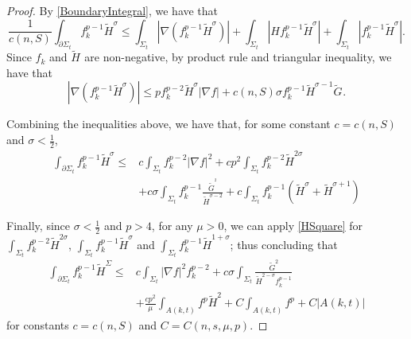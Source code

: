 \begin{proof}
    By \autoref{BoundaryIntegral}, we have that 
    \[
        \frac{1}{c(n,S)}\int_{\partial \Sigma_t} f_{k}^{p-1} \tilde{H}^{\sigma }  \leq \int_{\Sigma_t} \left| \nabla \left( f_{k}^{p-1} \tilde{H}^{\sigma }  \right)  \right| + \int_{\Sigma_t} \left| H f_{k}^{p-1} \tilde{H}^{\sigma } \right| + \int_{\Sigma_t} \left| f_{k}^{p-1} \tilde{H}^{\sigma } \right|.
    \]
    Since $f_{k}^{} $ and $\tilde{H}^{} $ are non-negative, by product rule and triangular inequality, we have that
    \[
        \left| \nabla \left( f_{k}^{p-1} \tilde{H}^{\sigma }  \right)  \right| \leq p f_{k}^{p-2} \tilde{H}^{\sigma } \left| \nabla f \right| +c(n,S) \sigma f_{k}^{p-1} \tilde{H}^{\sigma -1} \tilde{G}^{} .
    \]

    Combining the inequalities above, we have that, for some constant $c=c(n,S)$ and $\sigma < \frac{1}{2}$,
    \begin{equation}
    \begin{split}
        \int_{\partial \Sigma_t} f_{k}^{p-1} \tilde{H}^{\sigma }  
    \leq &c \int_{\Sigma_t} f_{k}^{p-2} \left| \nabla f \right| ^2 +cp^2 \int_{\Sigma_t} 
    f_{k}^{p-2} \tilde{H}^{2 \sigma } \\
    &+c \sigma \int_{\Sigma_t} f_{k}^{p-1} \frac{\tilde{G}^{^2} }{\tilde{H}^{\sigma -2} }+c \int_{\Sigma_t} f_{k}^{p-1} \left( \tilde{H}^{\sigma } +\tilde{H}^{\sigma +1}  \right) 
    \end{split}
    \end{equation} 

    Finally, since $\sigma < \frac{1}{2}$ and $p>4$, for any $\mu >0$, we can apply \autoref{HSquare} for $\int_{\Sigma_t} f_{k}^{p-2} \tilde{H}^{2 \sigma }  $, $\int_{\Sigma_t} f_{k}^{p-1} \tilde{H}^{ \sigma }  $ and $\int_{\Sigma_t} f_{k}^{p-1} \tilde{H}^{1+ \sigma }  $; thus concluding that
    \begin{equation}
        \begin{split}
            \int_{\partial \Sigma_t} f_{k}^{p-1}\tilde{H}^{\Sigma } 
        \leq & c \int_{\Sigma_t} \left| \nabla f \right| ^2 f_{k}^{p-2} +c \sigma \int_{\Sigma_t} \frac{\tilde{G}^{2} }{\tilde{H}^{2-\sigma } f_{k}^{p-1} } \\
        &+ \frac{cp^2}{\mu }\int_{A(k,t)}^{}f^p \tilde{H}^{2} + C \int_{A(k,t)}^{}f^p + C \left| A(k,t) \right|
        \end{split}
        \end{equation}
        for constants $c=c(n,S)$ and $C=C(n,s,\mu ,p)$.
\end{proof}

